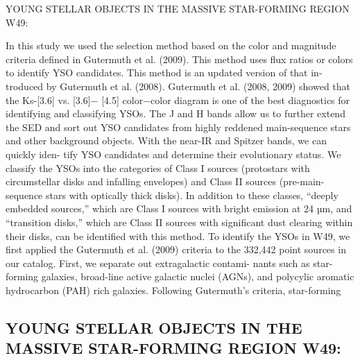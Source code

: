 \documentclass[../main.tex]{subfiles}
\begin{document}
{YOUNG STELLAR OBJECTS IN THE MASSIVE STAR-FORMING REGION W49:

In this study we used the selection method based on
the color and magnitude criteria defined in Gutermuth et al.
(2009). This method uses flux ratios or colors to identify
YSO candidates. This method is an updated version of that in-
troduced by Gutermuth et al. (2008). Gutermuth et al. (2008,
2009) showed that the Ks-[3.6] vs. [3.6]− [4.5] color−color
diagram is one of the best diagnostics for identifying and
classifying YSOs. The J and H bands allow us to further
extend the SED and sort out YSO candidates from highly
reddened main-sequence stars and other background objects.
With the near-IR and Spitzer bands, we can quickly iden-
tify YSO candidates and determine their evolutionary status.
We classify the YSOs into the categories of Class I sources
(protostars with circumstellar disks and infalling envelopes)
and Class II sources (pre-main-sequence stars with optically
thick disks). In addition to these classes, “deeply embedded
sources,” which are Class I sources with bright emission at
24 µm, and “transition disks,” which are Class II sources with
significant dust clearing within their disks, can be identified
with this method.
To identify the YSOs in W49, we first applied the
Gutermuth et al. (2009) criteria to the 332,442 point sources
in our catalog. First, we separate out extragalactic contami-
nants such as star-forming galaxies, broad-line active galactic
nuclei (AGNs), and polycylic aromatic hydrocarbon (PAH)
rich galaxies. Following Gutermuth’s criteria, star-forming

\subsection{YOUNG STELLAR OBJECTS IN THE MASSIVE STAR-FORMING REGION W49:}

}
\end{document}
